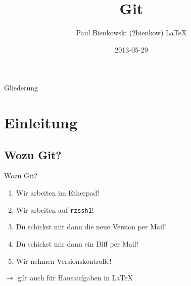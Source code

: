 \documentclass[compress,t,usenames,dvipsnames]{beamer}
\title{Git}
\author{Paul Bienkowski (2bienkow)  \LaTeX}
\institute{KunterBuntesSeminar}
\date{2013-05-29}
\begin{document}
\frame{
    \titlepage
}

\begin{frame}{Gliederung}
    \tableofcontents
\end{frame}

\section{Einleitung}
\subsection{Wozu Git?}

\begin{frame}{Wozu Git?}

    \begin{enumerate}
        \item<3-> Wir arbeiten im Etherpad!
        \item<4-> Wir arbeiten auf \texttt{rzssh1}!
        \item<5-> Du schickst mir dann die neue Version per Mail!
        \item<6-> Du schickst mir dann ein Diff per Mail!
        \item<7-> Wir nehmen Versionskontrolle!
    \end{enumerate}

     {
        $\rightarrow$ gilt auch für Hausaufgaben in \LaTeX
    }

    \vspace{0.2cm}


\end{frame}
\end{document}
